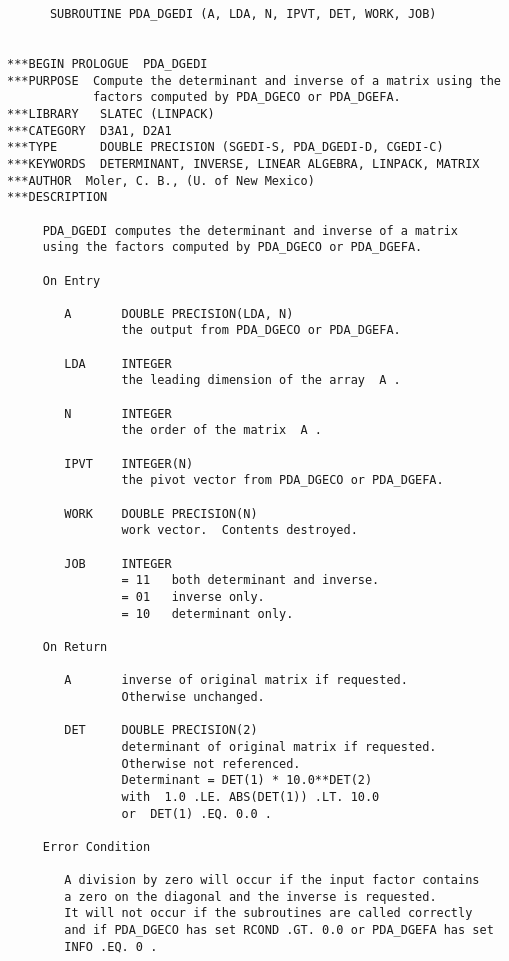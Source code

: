 
\begin{verbatim}
      SUBROUTINE PDA_DGEDI (A, LDA, N, IPVT, DET, WORK, JOB)


***BEGIN PROLOGUE  PDA_DGEDI
***PURPOSE  Compute the determinant and inverse of a matrix using the
            factors computed by PDA_DGECO or PDA_DGEFA.
***LIBRARY   SLATEC (LINPACK)
***CATEGORY  D3A1, D2A1
***TYPE      DOUBLE PRECISION (SGEDI-S, PDA_DGEDI-D, CGEDI-C)
***KEYWORDS  DETERMINANT, INVERSE, LINEAR ALGEBRA, LINPACK, MATRIX
***AUTHOR  Moler, C. B., (U. of New Mexico)
***DESCRIPTION

     PDA_DGEDI computes the determinant and inverse of a matrix
     using the factors computed by PDA_DGECO or PDA_DGEFA.

     On Entry

        A       DOUBLE PRECISION(LDA, N)
                the output from PDA_DGECO or PDA_DGEFA.

        LDA     INTEGER
                the leading dimension of the array  A .

        N       INTEGER
                the order of the matrix  A .

        IPVT    INTEGER(N)
                the pivot vector from PDA_DGECO or PDA_DGEFA.

        WORK    DOUBLE PRECISION(N)
                work vector.  Contents destroyed.

        JOB     INTEGER
                = 11   both determinant and inverse.
                = 01   inverse only.
                = 10   determinant only.

     On Return

        A       inverse of original matrix if requested.
                Otherwise unchanged.

        DET     DOUBLE PRECISION(2)
                determinant of original matrix if requested.
                Otherwise not referenced.
                Determinant = DET(1) * 10.0**DET(2)
                with  1.0 .LE. ABS(DET(1)) .LT. 10.0
                or  DET(1) .EQ. 0.0 .

     Error Condition

        A division by zero will occur if the input factor contains
        a zero on the diagonal and the inverse is requested.
        It will not occur if the subroutines are called correctly
        and if PDA_DGECO has set RCOND .GT. 0.0 or PDA_DGEFA has set
        INFO .EQ. 0 .


\end{verbatim}
